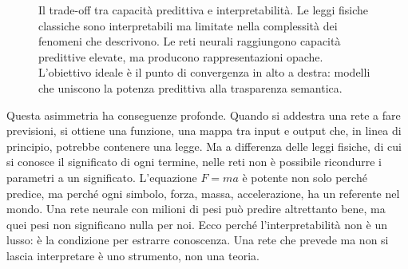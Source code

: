 \begin{figure}[htbp]
    \centering
    \caption{Il trade-off tra capacità predittiva e interpretabilità. Le leggi fisiche classiche sono interpretabili ma limitate nella complessità dei fenomeni che descrivono. Le reti neurali raggiungono capacità predittive elevate, ma producono rappresentazioni opache. L'obiettivo ideale è il punto di convergenza in alto a destra: modelli che uniscono la potenza predittiva alla trasparenza semantica.}
    \label{fig:tradeoff_prediction_interpretability}
\end{figure}
Questa asimmetria ha conseguenze profonde. Quando si addestra una rete a fare previsioni, si ottiene una funzione, una mappa tra input e output che, in linea di principio, potrebbe contenere una legge. Ma a differenza delle leggi fisiche, di cui si conosce il significato di ogni termine, nelle reti non è possibile ricondurre i parametri a un significato. L'equazione $F = ma$ è potente non solo perché predice, ma perché ogni simbolo, forza, massa, accelerazione, ha un referente nel mondo. Una rete neurale con milioni di pesi può predire altrettanto bene, ma quei pesi non significano nulla per noi.
Ecco perché l'interpretabilità non è un lusso: è la condizione per estrarre conoscenza. Una rete che prevede ma non si lascia interpretare è uno strumento, non una teoria.
